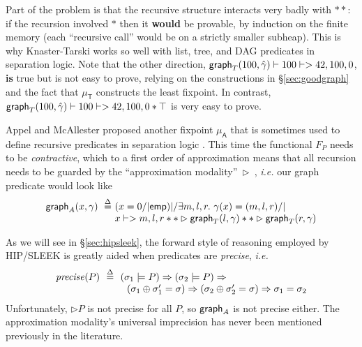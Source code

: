 Part of the problem is that the recursive structure interacts very badly with $**$: if the recursion involved $*$ then it \textbf{would} be provable, by induction on the finite memory (each ``recursive call'' would be on a strictly smaller subheap).  This is why Knaster-Tarski works so well with list, tree, and DAG predicates in separation logic.  Note that the other direction, \mbox{$\mathsf{graph}_T(100,\hat{\gamma}) |- 100 |-> 42,100,0$},
\textbf{is} true but is not easy to prove, relying on the constructions in \S\ref{sec:goodgraph} and the fact that $\mu_{\mathsf{T}}$ constructs the least fixpoint.  In contrast, $\mathsf{graph}_T(100,\hat{\gamma}) |- 100 |-> 42,100,0 * \top$ is very easy to prove. %





Appel and McAllester proposed another fixpoint $\mu_{\mathsf{A}}$
that is sometimes used to define recursive predicates in separation
logic \cite{appel:fixpoint}.  This time the functional $F_P$ needs to be
\emph{contractive}, which to a first order of approximation means that
all recursion needs to be guarded by the ``approximation
modality''~$\rhd$~\cite{appel:vmm}, \emph{i.e.} our graph predicate would
look like
\[
\begin{array}{@{}l@{}l@{}}
\grapham(x, \gamma) ~ \stackrel{\Delta}{=} ~ & (x = 0 /| \p{emp}) |/ \exists m,l,r.~ \gamma(x)=(m,l,r) /| \null \\
& x |-> m,l,r ** \rhd \graphkt(l, \gamma) ** \rhd \graphkt(r, \gamma)
\end{array}
\]

As we will see in \S\ref{sec:hipsleek}, the forward style of reasoning employed by
HIP/SLEEK is greatly aided when predicates are \emph{precise}, \emph{i.e.}
\[
\begin{array}{@{}l@{}l@{}}
\m{precise}(P) ~~ \defeq ~~ & (\sigma_1 |= P) => (\sigma_2 |= P) => \\
& ~~ (\sigma_1 \oplus \sigma_1' = \sigma) => (\sigma_2 \oplus \sigma_2' = \sigma) => \sigma_1 = \sigma_2
\end{array}
\]
Unfortunately, $\rhd P$ is not precise for all $P$, so $\mathsf{graph}_A$ is not precise either.  The approximation modality's universal imprecision has never been mentioned previously in the literature.  %

